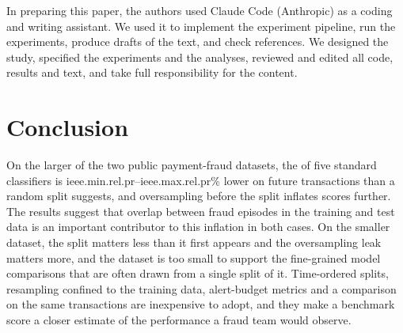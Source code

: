 \ifanon\else
\begin{acks}
In preparing this paper, the authors used Claude Code (Anthropic) as a coding and writing assistant. We used it to implement the experiment pipeline, run the experiments, produce drafts of the text, and check references. We designed the study, specified the experiments and the analyses, reviewed and edited all code, results and text, and take full responsibility for the content.
\end{acks}
\fi

\section{Conclusion}

On the larger of the two public payment-fraud datasets, the \prauc{} of five standard classifiers is \num{ieee.min.rel.pr}--\num{ieee.max.rel.pr}\% lower on future transactions than a random split suggests, and oversampling before the split inflates scores further. The results suggest that overlap between fraud episodes in the training and test data is an important contributor to this inflation in both cases. On the smaller dataset, the split matters less than it first appears and the oversampling leak matters more, and the dataset is too small to support the fine-grained model comparisons that are often drawn from a single split of it. Time-ordered splits, resampling confined to the training data, alert-budget metrics and a comparison on the same transactions are inexpensive to adopt, and they make a benchmark score a closer estimate of the performance a fraud team would observe.
